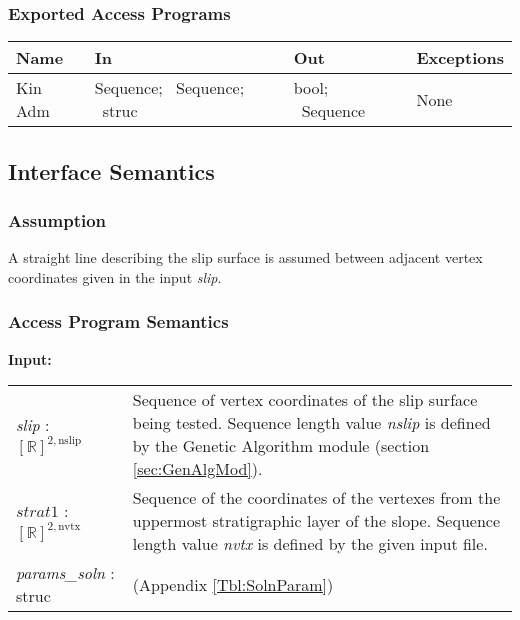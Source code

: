 \documentclass[12pt]{article}
\begin{document}
\subsubsection{Exported Access Programs}
\begin{center}
\renewcommand*{\arraystretch}{1.5}
\begin{tabular}{| p{} | p{} | 
p{} | p{} |} \hline 

  \textbf{Name} & \textbf{In} & \textbf{Out} & \textbf{Exceptions}
  \\ \hline

  Kin Adm & Sequence; ~\newline Sequence; ~\newline struc & bool;
  ~\newline Sequence & None \\ \hline

\end{tabular}
\end{center}

\subsection{Interface Semantics}

\subsubsection{Assumption}
A straight line describing the slip surface is assumed between
adjacent vertex coordinates given in the input \textit{slip}.

\subsubsection{Access Program Semantics}
\textbf{Input:}
\renewcommand*{\arraystretch}{1.5}
\begin{longtable}{p{} p{}}
  \textit{slip} : $[\mathbb{R}]^{2,\text{nslip}}$ & Sequence of vertex
  coordinates of the slip surface being tested. Sequence length value
  \textit{nslip} is defined by the Genetic Algorithm module (section
  \ref{sec:GenAlgMod}).\\
  
  $\textit{strat1}$ : $[\mathbb{R}]^{2,\text{nvtx}}$ & Sequence of
  the coordinates of the vertexes from the uppermost stratigraphic
  layer of the slope. Sequence length value \textit{nvtx} is defined
  by the given input file. \\
  
  \textit{params\_soln} : struc & (Appendix
  \ref{Tbl:SolnParam})
\end{longtable}
\end{document}
